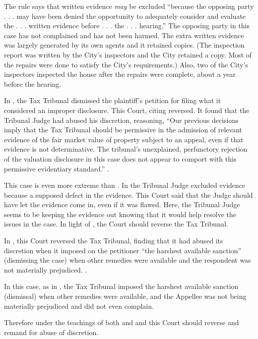 \documentclass[12pt,\documentclassflag]{michiganCourtOfAppealsBrief}
\begin{document}
{The rule says that written evidence \emph{may} be excluded ``because the opposing party . . . may have been denied the opportunity to adequately consider and evaluate the . . . written evidence before . . . the . . .  hearing.'' The opposing party in this case has not complained and has not been harmed. The extra written evidence was largely generated by its own agents and it retained copies. (The inspection report was written by the City's inspectors and the City retained a copy. Most of the repairs were done to satisfy the City's requirements.) Also, two of the City's inspectors inspected the house after the repairs were complete, about a year before the hearing.

In \cite[s]{Professional Plaza}, the Tax Tribunal dismissed the plaintiff's petition for filing what it considered an improper disclosure. This Court, citing  reversed. It found that the Tribunal Judge had abused his discretion, reasoning, ``Our previous decisions imply that the Tax Tribunal should be permissive in the admission of relevant evidence of the fair market value of property subject to an appeal, even if that evidence is not determinative. The tribunal's unexplained, perfunctory rejection of the valuation disclosure in this case does not appear to comport with this permissive evidentiary standard.'' .

This case is even more extreme than \cite[s]{Professional Plaza}. In \cite[s]{Professional Plaza} the Tribunal Judge excluded evidence because a supposed defect in the evidence. This Court said that the Judge should have let the evidence come in, even if it was flawed. Here, the Tribunal Judge seems to be keeping the evidence out knowing that it would help resolve the issues in the case. In light of \cite[s]{Professional Plaza}, the Court should reverse the Tax Tribunal.

In \cite{Stevens}, this Court reversed the Tax Tribunal, finding that it had abused its discretion when it imposed on the petitioner ``the harshest available sanction'' (dismissing the case) when other remedies were available and the respondent was not materially prejudiced. .

In this case, as in \cite[s]{Stevens}, the Tax Tribunal imposed the harshest available sanction (dismissal) when other remedies were available, and the Appellee was not being materially prejudiced and did not even complain. 

Therefore under the teachings of both \cite[s] {Professional Plaza} and and  \cite[s]{Stevens} this Court should reverse and remand for abuse of discretion.

}
\end{document}
